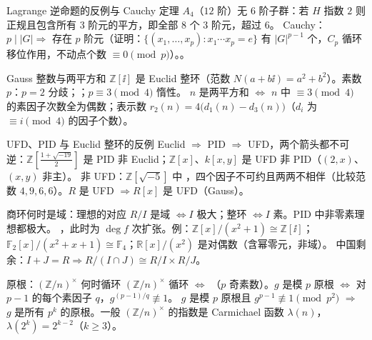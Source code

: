 \begin{结论}{Lagrange 逆命题的反例与 Cauchy 定理}
$A_4$（$12$ 阶）无 $6$ 阶子群：若 $H$ 指数 $2$ 则正规且包含所有 $3$ 阶元的平方，即全部 $8$ 个 $3$ 阶元，超过 $6$。
Cauchy：$p\mid|G|\Rightarrow$ 存在 $p$ 阶元（证明：$\{(x_1,\dots,x_p):x_1\cdots x_p=e\}$ 有 $|G|^{p-1}$ 个，$C_p$ 循环移位作用，不动点个数 $\equiv0\pmod p$）。。
\end{结论}

\begin{结论}{Gauss 整数与两平方和}
$\mathbb Z[\ii]$ 是 Euclid 整环（范数 $N(a+b\ii)=a^2+b^2$）。素数 $p$：$p=2$ 分歧；；$p\equiv3\pmod4$ 惰性。
$n$ 是两平方和 $\iff$ $n$ 中 $\equiv3\pmod4$ 的素因子次数全为偶数；表示数 $r_2(n)=4\bigl(d_1(n)-d_3(n)\bigr)$（$d_i$ 为 $\equiv i\pmod 4$ 的因子个数）。
\end{结论}

\begin{结论}{UFD、PID 与 Euclid 整环的反例}
Euclid $\Rightarrow$ PID $\Rightarrow$ UFD，两个箭头都不可逆：$\mathbb Z[\frac{1+\sqrt{-19}}2]$ 是 PID 非 Euclid；$\mathbb Z[x]$、$k[x,y]$ 是 UFD 非 PID（$(2,x)$、$(x,y)$ 非主）。
非 UFD：$\mathbb Z[\sqrt{-5}]$ 中 ，四个因子不可约且两两不相伴（比较范数 $4,9,6,6$）。$R$ 是 UFD $\Rightarrow R[x]$ 是 UFD（Gauss）。
\end{结论}

\begin{结论}{商环何时是域：理想的对应}
$R/I$ 是域 $\iff I$ 极大；整环 $\iff I$ 素。PID 中非零素理想都极大。
，此时为 $\deg f$ 次扩张。例：$\mathbb Z[x]/(x^2+1)\cong\mathbb Z[\ii]$；$\mathbb F_2[x]/(x^2+x+1)\cong\mathbb F_4$；$\mathbb R[x]/(x^2)$ 是对偶数（含幂零元，非域）。
中国剩余：$I+J=R\Rightarrow R/(I\cap J)\cong R/I\times R/J$。
\end{结论}

\begin{结论}{原根：$(\mathbb Z/n)^\times$ 何时循环}
$(\mathbb Z/n)^\times$ 循环 $\iff$ （$p$ 奇素数）。$g$ 是模 $p$ 原根 $\iff$ 对 $p-1$ 的每个素因子 $q$，$g^{(p-1)/q}\not\equiv1$。
$g$ 是模 $p$ 原根且 $g^{p-1}\not\equiv1\pmod{p^2}$ $\Rightarrow$ $g$ 是所有 $p^k$ 的原根。一般 $(\mathbb Z/n)^\times$ 的指数是 Carmichael 函数 $\lambda(n)$，$\lambda(2^k)=2^{k-2}$（$k\ge3$）。
\end{结论}

